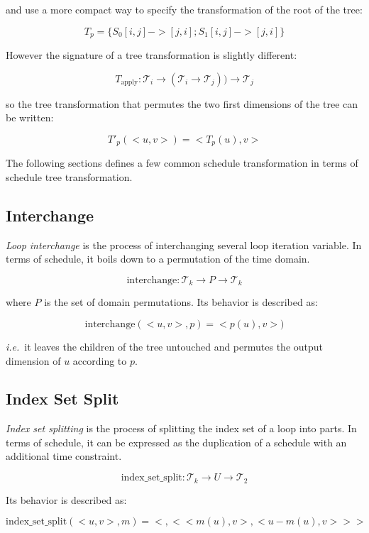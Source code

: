 \documentclass{article}
\begin{document}
\noindent and use a more compact way to specify the transformation of the root of the tree:

\[
    T_p = \{ S_0[i,j] -> [j,i] ; S_1[i,j] -> [j,i] \}
\]

However the signature of a tree transformation is slightly different:

\[
    T_\text{apply}: \mathcal{T}_i \rightarrow ( \mathcal{T}_i \rightarrow \mathcal{T}_j) ) \rightarrow \mathcal{T}_j
\]


\noindent so the tree transformation that permutes the two first dimensions of the tree can be written:

\[
    T'_p(< u, v >) = < T_p(u), v >
\]


The following sections defines a few common schedule transformation in terms of schedule tree transformation.

\subsection{Interchange}

\emph{Loop interchange} is the process of interchanging several loop iteration
variable. In terms of schedule, it boils down to a permutation of the time
domain.

\[
    \text{interchange}: \mathcal{T}_k \rightarrow P \rightarrow \mathcal{T}_k
\]

\noindent where $P$ is the set of domain permutations. Its behavior is described as:

\[
    \text{interchange}(<u, v>, p) = <p(u), v>)
\]

\noindent \emph{i.e.}\ it leaves the children of the tree untouched and
permutes the output dimension of $u$ according to $p$.

\subsection{Index Set Split}

\emph{Index set splitting} is the process of splitting the index set of a loop
into parts. In terms of schedule, it can be expressed as the duplication of a
schedule with an additional time constraint.

\[
    \text{index\_set\_split}: \mathcal{T}_k \rightarrow U \rightarrow \mathcal{T}_2
\]

Its behavior is described as:

\[
    \text{index\_set\_split}(<u, v>, m) = < {}, < < m(u), v>, < u - m(u), v> > >
\]
\end{document}
